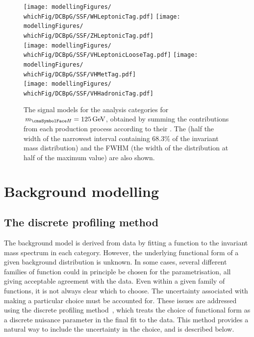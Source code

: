 \ifNewAnalysis
\begin{figure}[htp!]
\centering
\texttt{[image: modellingFigures/\\whichFig/DCBpG/SSF/WHLeptonicTag.pdf]} 
\texttt{[image: modellingFigures/\\whichFig/DCBpG/SSF/ZHLeptonicTag.pdf]} \\
\texttt{[image: modellingFigures/\\whichFig/DCBpG/SSF/VHLeptonicLooseTag.pdf]} 
\texttt{[image: modellingFigures/\\whichFig/DCBpG/SSF/VHMetTag.pdf]} \\
\texttt{[image: modellingFigures/\\whichFig/DCBpG/SSF/VHHadronicTag.pdf]} 

\caption{The signal models for the \VHTag analysis categories for $\mH=125\GeV$, obtained by summing the contributions from each production process according to their \effxacc. The \effSigma (half the width of the narrowest interval containing 68.3\% of the invariant mass distribution) and the FWHM (the width of the distribution at half of the maximum value) are also shown.}

\label{fig:model:sig_model_per_category_tris}
\end{figure}
\fi


\section{Background modelling}
\label{model:sec:background_model}
\subsection{The discrete profiling method}
\label{model:sec:background_model_envelope}

The background model is derived from data by fitting a function to the invariant mass spectrum in each category. However, the underlying functional form of a given background distribution is unknown. In some cases, several different families of function could in principle be chosen for the parametrisation, all giving acceptable agreement with the data. Even within a given family of functions, it is not always clear which to choose. The uncertainty associated with making a particular choice must be accounted for. %
These issues are addressed using the discrete profiling method~\cite{DiscreteProfiling}, which treats the choice of functional form as a discrete nuisance parameter in the final \NLL fit to the data. This method provides a natural way to include the uncertainty in the choice, and is described below.


